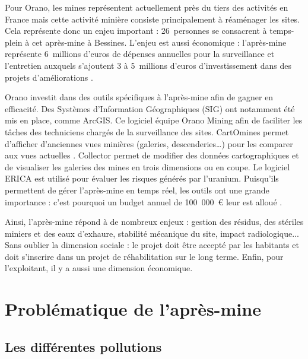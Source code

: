 \documentclass{article}
\begin{document}
Pour Orano, les mines représentent actuellement près du tiers des activités en France mais cette activité minière consiste principalement à réaménager les sites. Cela représente donc un enjeu important : 26~personnes se consacrent à temps-plein à cet après-mine à Bessines. L'enjeu est aussi économique : l’après-mine représente 6~millions d’euros de dépenses annuelles pour la surveillance et l’entretien auxquels s’ajoutent 3 à 5~millions d’euros d’investissement dans des projets d’améliorations \cite{himeur_apres-mine_2020}. 

Orano investit dans des outils spécifiques à l’après-mine afin de gagner en efficacité. Des Systèmes d’Information Géographiques (SIG) ont notamment été mis en place, comme ArcGIS. Ce logiciel équipe Orano Mining afin de faciliter les tâches des techniciens chargés de la surveillance des sites.
CartOmines permet d’afficher d’anciennes vues minières (galeries, descenderies…) pour les comparer aux vues actuelles \cite{noauthor_cartomines_nodate}. Collector permet de modifier des données cartographiques et de visualiser les galeries des mines en trois dimensions ou en coupe. Le logiciel ERICA est utilisé pour évaluer les risques générés par l’uranium. Puisqu’ils permettent de gérer l’après-mine en temps réel, les outils ont une grande importance : c’est pourquoi un budget annuel de 100~000~\euro{} leur est alloué \cite{gerland_outils_2020}.

Ainsi, l’après-mine répond à de nombreux enjeux : gestion des résidus, des stériles miniers et des eaux d’exhaure, stabilité mécanique du site, impact radiologique... Sans oublier la dimension sociale : le projet doit être accepté par les habitants et doit s’inscrire dans un projet de réhabilitation sur le long terme. Enfin, pour l’exploitant, il y a aussi une dimension économique.


\newpage
\section{Problématique de l’après-mine}
\subsection{Les différentes pollutions}
\end{document}
